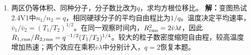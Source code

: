 \documentclass[UTF8,fontset=fandol,a4paper,11pt]{ctexart}
\begin{document}
\begin{enumerate}
\item 两区仍等体积、同种分子，分子数比改为$q$，求均方根位移比。
\textbf{解：}变图热试2.4V1中$n_1/n_2=q$，相同硬球分子的平均自由程比为$1/q$。温度决定平均速率，$\bar v_1/\bar v_2=(T_1/T_2)^{1/2}$。在同一观察时间内，$R_{\rm rms}^2=2\bar v\lambda t$，因此$R_{1,\rm rms}/R_{2,\rm rms}=q^{-1/2}(T_1/T_2)^{1/4}$。较大的粒子数密度缩短自由程，较高温度增加热速；两个效应在乘积$\bar v\lambda$中分别计入，$q=2$恢复本题。
\begin{center}\begin{minipage}{.98\linewidth}\centering
{}
\end{minipage}
\end{center}
\end{enumerate}
\end{document}
